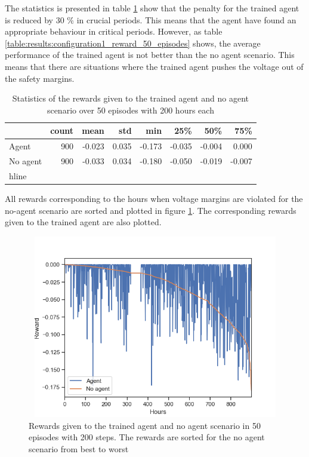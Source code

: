 \documentclass[class=book, crop=false]{standalone}
\begin{document}
The statistics is presented in table \ref{table:results:configuration1_reward_50_ep_preventive} show that the penalty for the trained agent is reduced by 30 \% in crucial periods. This means that the agent have found an appropriate behaviour in critical periods. However, as table
\ref{table:results:configuration1_reward_50_episodes} shows, the average performance of the trained agent is not better than the no agent scenario. This means that there are situations where the trained agent pushes the voltage out of the safety margins.    


\begin{table}[]
\center
\label{table:results:configuration1_reward_50_ep_preventive}
\caption{Statistics of the rewards given to the trained agent and no agent scenario over 50 episodes with 200 hours each}
\begin{tabular}{l|rrrrrrr}
         & count & mean   & std   & min    & 25\%   & 50\%   & 75\%   \\
\hline
Agent    & 900   & -0.023 & 0.035 & -0.173 & -0.035 & -0.004 & 0.000  \\
No agent & 900   & -0.033 & 0.034 & -0.180 & -0.050 & -0.019 & -0.007\\
hline
\end{tabular}
\end{table}



All rewards corresponding to the hours when voltage margins are violated for the no-agent scenario are sorted and plotted in figure \ref{fig:results:configuration1_sorted_reward_voltage}. The corresponding rewards given to the trained agent are also plotted. 


\begin{figure}[ht]
    \center
\includegraphics[height=8cm, width=12cm]{figures/sorted_reward_voltage_config1.png}
    \caption[size = 9]{Rewards given to the trained agent and no agent scenario in 50 episodes with 200 steps. The rewards are sorted for the no agent scenario from best to worst}
    \label{fig:results:configuration1_sorted_reward_voltage}
\end{figure}
\end{document}
